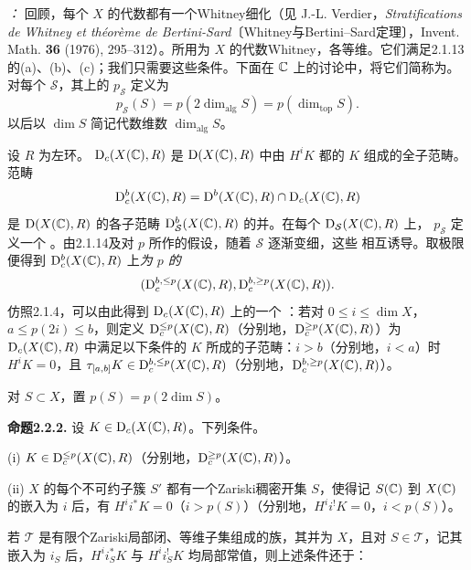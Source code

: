 \emph{：} 回顾，每个 $X$ 的代数都有一个Whitney细化（见 J.-L. Verdier，\emph{Stratifications de Whitney et théorème de Bertini-Sard}〔Whitney与Bertini--Sard定理〕，Invent. Math. \textbf{36} (1976), 295--312）。所用为 $X$ 的代数Whitney，各等维。它们满足2.1.13的(a)、(b)、(c)；我们只需要这些条件。下面在 $\mathbb C$ 上的讨论中，将它们简称为。对每个 $\mathcal S$，其上的 $p_{\mathcal S}$ 定义为
\[
 p_{\mathcal S}(S)=p(2\dim_{\mathrm{alg}}S)=p(\dim_{\mathrm{top}}S).
\]
以后以 $\dim S$ 简记代数维数 $\dim_{\mathrm{alg}}S$。

设 $R$ 为左环。\emph{} $\mathrm{D}_c(X(\mathbb C),R)$ 是 $\mathrm{D}(X(\mathbb C),R)$ 中由 $H^iK$ 都的 $K$ 组成的全子范畴。范畴
\[
 \mathrm{D}_c^b(X(\mathbb C),R)=\mathrm{D}^b(X(\mathbb C),R)\cap\mathrm{D}_c(X(\mathbb C),R)
\]
是 $\mathrm{D}(X(\mathbb C),R)$ 的各子范畴 $\mathrm{D}_{\mathcal S}^b(X(\mathbb C),R)$ 的并。在每个 $\mathrm{D}_{\mathcal S}(X(\mathbb C),R)$ 上， $p_{\mathcal S}$ 定义一个 。由2.1.14及对 $p$ 所作的假设，随着 $\mathcal S$ 逐渐变细，这些 相互诱导。取极限便得到 $\mathrm{D}_c^b(X(\mathbb C),R)$ 上\emph{为 $p$ 的 }
\[
 (\mathrm{D}_c^{b,\leq p}(X(\mathbb C),R),\mathrm{D}_c^{b,\geq p}(X(\mathbb C),R)).
\]
仿照2.1.4，可以由此得到 $\mathrm{D}_c(X(\mathbb C),R)$ 上的一个 ：若对 $0\leq i\leq\dim X$，$a\leq p(2i)\leq b$，则定义 $\mathrm{D}_c^{\leq p}(X(\mathbb C),R)$（分别地，$\mathrm{D}_c^{\geq p}(X(\mathbb C),R)$）为
$\mathrm{D}_c(X(\mathbb C),R)$ 中满足以下条件的 $K$ 所成的子范畴：$i>b$（分别地，$i<a$）时 $H^iK=0$，且 $\tau_{[a,b]}K\in\mathrm{D}_c^{b,\leq p}(X(\mathbb C),R)$（分别地，$\mathrm{D}_c^{b,\geq p}(X(\mathbb C),R)$）。

对 $S\subset X$，置 $p(S)=p(2\dim S)$。

\par\medskip\noindent\textbf{命题2.2.2.} 设 $K\in\mathrm{D}_c(X(\mathbb C),R)$。下列条件。

(i) $K\in\mathrm{D}_c^{\leq p}(X(\mathbb C),R)$（分别地，$\mathrm{D}_c^{\geq p}(X(\mathbb C),R)$）。

(ii) $X$ 的每个不可约子簇 $S'$ 都有一个Zariski稠密开集 $S$，使得记 $S(\mathbb C)$ 到 $X(\mathbb C)$ 的嵌入为 $i$ 后，有 $H^ii^*K=0$（$i>p(S)$）（分别地，$H^ii^!K=0$，$i<p(S)$）。

若 $\mathcal T$ 是有限个Zariski局部闭、等维子集组成的族，其并为 $X$，且对 $S\in\mathcal T$，记其嵌入为 $i_S$ 后，$H^ii_S^*K$ 与 $H^ii_S^!K$ 均局部常值，则上述条件还于：

